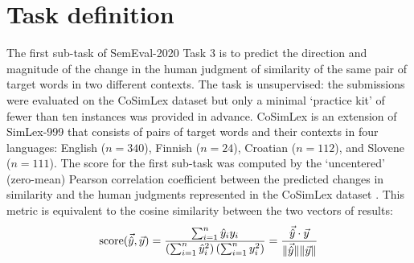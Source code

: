 \section{Task definition}
\label{sec:task-definition}

The first sub-task of SemEval-2020 Task 3 is to predict the direction and magnitude of
the change in the human judgment of similarity of the same pair of target words in two
different contexts.
The task is unsupervised: the submissions were evaluated on the CoSimLex dataset
\parencites[39-42]{Armendariz2020} but only a minimal `practice kit' of fewer than ten
instances was provided in advance.
CoSimLex is an extension of SimLex-999 \parencites{Hill2015} that consists of pairs of
target words and their contexts in four languages: English ($n = 340$), Finnish ($n =
  24$), Croatian ($n = 112$), and Slovene ($n = 111$).
The score for the first sub-task was computed by the `uncentered' (zero-mean) Pearson
correlation coefficient between the predicted changes in similarity and the human
judgments represented in the CoSimLex dataset \parencites[42]{Armendariz2020}.
This metric is equivalent to the cosine similarity between the two vectors of results:
\begin{equation}
  \text{score}(\vec{\hat{y}}, \vec{y})
  = \frac{\sum_{i = 1}^{n} \hat{y}_i y_i}{\left( \sum_{i = 1}^{n} \hat{y}_i^2 \right)\left( \sum_{i = 1}^{n} y_i^2 \right)}
  = \frac{\vec{\hat{y}} \cdot \vec{y}}{\lVert \vec{\hat{y}} \rVert \lVert \vec{y} \rVert}
\end{equation}

